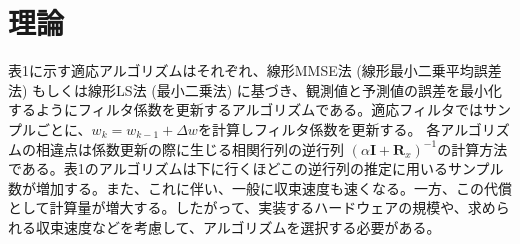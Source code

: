 \documentclass[a4paper, twocolumn]{ltjsarticle}
\begin{document}



\section{理論}






  表1に示す適応アルゴリズムはそれぞれ、線形MMSE法 (線形最小二乗平均誤差法) もしくは線形LS法 (最小二乗法) に基づき、観測値と予測値の誤差を最小化するようにフィルタ係数を更新するアルゴリズムである。適応フィルタではサンプルごとに、\(w_k = w_{k-1} + \Delta w\)を計算しフィルタ係数を更新する。 各アルゴリズムの相違点は係数更新の際に生じる相関行列の逆行列 \( \left(\alpha \symbf{I} + \symbf{R}_x\right) ^ {-1} \)の計算方法である。表1のアルゴリズムは下に行くほどこの逆行列の推定に用いるサンプル数が増加する。また、これに伴い、一般に収束速度も速くなる。一方、この代償として計算量が増大する。したがって、実装するハードウェアの規模や、求められる収束速度などを考慮して、アルゴリズムを選択する必要がある。
\end{document}
